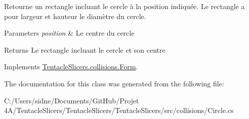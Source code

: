 Retourne un rectangle incluant le cercle à la position indiquée. Le rectangle a pour largeur et hauteur le diamètre du cercle. 


\begin{DoxyParams}{Parameters}
{\em position} & Le centre du cercle \\
\hline
\end{DoxyParams}
\begin{DoxyReturn}{Returns}
Le rectangle incluant le cercle et son centre 
\end{DoxyReturn}


Implements \hyperlink{class_tentacle_slicers_1_1collisions_1_1_form_a00c94b5a1e83d9db6aa3a4cab969fd2c}{Tentacle\+Slicers.\+collisions.\+Form}.



The documentation for this class was generated from the following file\+:\begin{DoxyCompactItemize}
\item 
C\+:/\+Users/sidne/\+Documents/\+Git\+Hub/\+Projet 4\+A/\+Tentacle\+Slicers/\+Tentacle\+Slicers/\+Tentacle\+Slicers/src/collisions/Circle.\+cs\end{DoxyCompactItemize}
